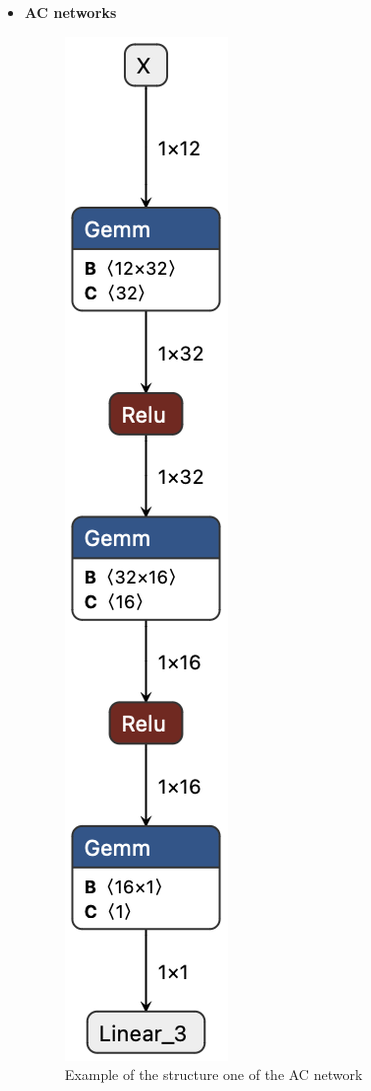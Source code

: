 \begin{itemize}
    \item \textbf{AC networks}\\
    \begin{figure}[H]
        \caption{\label{fig:AC-network} Example of the structure one of the AC network}
        \centering
        \includegraphics[scale=0.3]{"Chapter7/img/AC1.png"}
    \end{figure}


\end{itemize}
